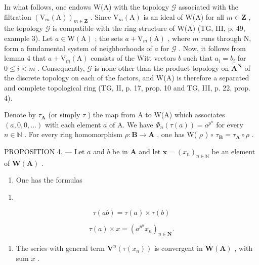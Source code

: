 In what follows, one endows W(A) with the topology \(\mathcal{G}\) associated with the filtration \((\mathrm{V}_m(\mathrm{A}))_{m\in \mathbf{Z}}\) . Since \(\mathrm{V}_m(\mathrm{A})\) is an ideal of W(A) for all \(m\in \mathbf{Z}\) , the topology \(\mathcal{G}\) is compatible with the ring structure of W(A) (TG, III, p. 49, example 3). Let \(a\in \mathrm{W(A)}\) ; the sets \(a + \mathrm{V}_m(\mathrm{A})\) , where \(m\) runs through N, form a fundamental system of neighborhoods of \(a\) for \(\mathcal{G}\) . Now, it follows from lemma 4 that \(a + \mathrm{V}_m(\mathrm{A})\) consists of the Witt vectors \(b\) such that \(a_i = b_i\) for \(0\leqslant i < m\) . Consequently, \(\mathcal{G}\) is none other than the product topology on \(\mathbf{A}^{\mathbf{N}}\) of the discrete topology on each of the factors, and W(A) is therefore a separated and complete topological ring (TG, II, p. 17, prop. 10 and TG, III, p. 22, prop. 4).

Denote by \(\tau_{\mathbf{A}}\) (or simply \(\tau\) ) the map from A to W(A) which associates \((a, 0, 0, \ldots)\) with each element \(a\) of A. We have \(\Phi_n(\tau(a)) = a^{p^n}\) for every \(n \in \mathbb{N}\) . For every ring homomorphism \(\rho: \mathbf{B} \to \mathbf{A}\) , one has W( \(\rho\) ) \(\circ\) \(\tau_{\mathbf{B}} = \tau_{\mathbf{A}} \circ \rho\) .

PROPOSITION 4. --- Let \(a\) and \(b\) be in \(\mathbf{A}\) and let \(\boldsymbol{x} = (x_n)_{n \in \mathbb{N}}\) be an element of \(\mathbf{W}(\mathbf{A})\) .

\begin{enumerate}
\def\labelenumi{\alph{enumi})}
\tightlist
\item
  One has the formulas
\end{enumerate}

\begin{enumerate}
\def\labelenumi{(\arabic{enumi})}
\setcounter{enumi}{37}
\tightlist
\item
\end{enumerate}

\[
\tau (a b) = \tau (a) \times \tau (b)\tag{39}
\]

\[
\tau (a) \times x = (a ^ {p ^ {n}} x _ {n}) _ {n \in \mathbf {N}}.
\]

\begin{enumerate}
\def\labelenumi{\alph{enumi})}
\setcounter{enumi}{1}
\tightlist
\item
  The series with general term \(\mathbf{V}^{n}(\tau(x_{n}))\) is convergent in \(\mathbf{W}(\mathbf{A})\) , with sum \(x\) .
\end{enumerate}

